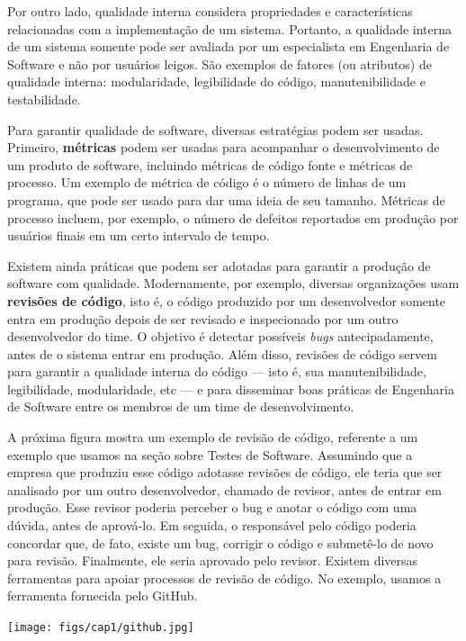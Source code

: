 \documentclass[
  11pt,
  twoside]{book}
\let\origfigure\figure
\let\endorigfigure\endfigure
\renewenvironment{figure}[1][2] {
    \expandafter\origfigure\expandafter[!h]
} {
    \endorigfigure
}
\begin{document}
 Por outro lado, qualidade interna
considera propriedades e características relacionadas com a
implementação de um sistema. Portanto, a qualidade interna de um sistema
somente pode ser avaliada por um especialista em Engenharia de Software
e não por usuários leigos. São exemplos de fatores (ou atributos) de
qualidade interna: modularidade, legibilidade do código,
manutenibilidade e testabilidade.

Para garantir qualidade de software, diversas estratégias podem ser
usadas. Primeiro, \textbf{métricas} podem ser usadas para acompanhar o
desenvolvimento de um produto de software, incluindo métricas de código
fonte e métricas de processo. Um exemplo de métrica de código é o número
de linhas de um programa, que pode ser usado para dar uma ideia de seu
tamanho. Métricas de processo incluem, por exemplo, o número de defeitos
reportados em produção por usuários finais em um certo intervalo de
tempo.

 Existem ainda práticas que podem ser adotadas
para garantir a produção de software com qualidade. Modernamente, por
exemplo, diversas organizações usam \textbf{revisões de código}, isto é,
o código produzido por um desenvolvedor somente entra em produção depois
de ser revisado e inspecionado por um outro desenvolvedor do time. O
objetivo é detectar possíveis \emph{bugs} antecipadamente, antes de o
sistema entrar em produção. Além disso, revisões de código servem para
garantir a qualidade interna do código --- isto é, sua manutenibilidade,
legibilidade, modularidade, etc --- e para disseminar boas práticas de
Engenharia de Software entre os membros de um time de desenvolvimento.

A próxima figura mostra um exemplo de revisão de código, referente a um
exemplo que usamos na seção sobre Testes de Software. Assumindo que a
empresa que produziu esse código adotasse revisões de código, ele teria
que ser analisado por um outro desenvolvedor, chamado de revisor, antes
de entrar em produção. Esse revisor poderia perceber o bug e anotar o
código com uma dúvida, antes de aprová-lo. Em seguida, o responsável
pelo código poderia concordar que, de fato, existe um bug, corrigir o
código e submetê-lo de novo para revisão. Finalmente, ele seria aprovado
pelo revisor. Existem diversas ferramentas para apoiar processos de
revisão de código. No exemplo, usamos a ferramenta fornecida pelo
GitHub.

\begin{figure}
\centering
\texttt{[image: figs/cap1/github.jpg]}
\caption{Exemplo de revisão de código.}
\end{figure}
\end{document}
